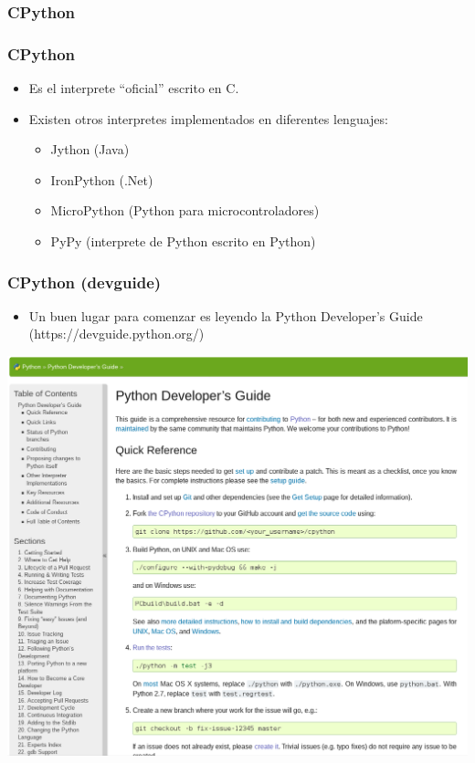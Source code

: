 \documentclass[spanish]{beamer}
\begin{document}
\subsubsection{CPython}
\begin{frame}
	\frametitle{CPython}
	\begin{itemize}
		\item Es el interprete ``oficial'' escrito en C. 
		\item Existen otros interpretes implementados en diferentes lenguajes:
			\begin{itemize}
				\item Jython (Java)
				\item IronPython (.Net)
				\item MicroPython (Python para microcontroladores)
				\item PyPy (interprete de Python escrito en Python)
			\end{itemize}
	\end{itemize}
\end{frame}
\begin{frame}
	\frametitle{CPython (devguide)}
	\begin{itemize}
		\item Un buen lugar para comenzar es leyendo la Python Developer's Guide
			(https://devguide.python.org/)
	\end{itemize}
	\center
	\includegraphics[width=1\linewidth]{devguide.png}
\end{frame}
\end{document}
